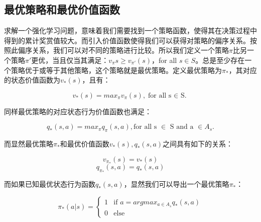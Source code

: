 \documentclass{standalone}
\begin{document}
\subsection{最优策略和最优价值函数}
求解一个强化学习问题，意味着我们需要找到一个策略函数，使得其在决策过程中得到的累计奖赏值较大。而引入价值函数使得我们可以获得对策略的偏序关系。按照此偏序关系，我们可以对不同的策略进行比较。所以我们定义一个策略$\pi$比另一个策略$\pi'$更优，当且仅当其满足：$v_{\pi}{}s \geq v_{\pi'}(s)$，for all $s \in S$。总是至少存在一个策略优于或等于其他策略，这个策略就是最优策略。定义最优策略为$\pi_{*}$，其对应的状态价值函数为$v_{*}(s)$，且有：
\begin{center}
    \begin{equation}
        v_{*}(s) = max_{\pi}v_{\pi}(s),
        \mbox{for all s $\in$ S.}
    \end{equation}
\end{center}
同样最优策略的对应状态行为价值函数也满足：
\begin{center}
    \begin{equation}
        q_{*}(s, a) = max_{\pi}q_{\pi}(s, a),
        \mbox{for all s $\in$ S and a $\in A_s$.}
    \end{equation}
\end{center}
而显然最优策略$\pi_{*}$和最优价值函数$v_{*}(s), q_{*}(s, a)$之间具有如下的关系：
\begin{center}
    \begin{equation}
        v_{\pi_*}(s) = v_{*}(s)
    \end{equation}
    \begin{equation}
        q_{\pi_*}(s, a) = q_{*}(s, a)
    \end{equation}
\end{center}
而如果已知最优状态行为函数$q_{*}(s, a)$，显然我们可以导出一个最优策略$\pi_{*}$：
\begin{center}
    \begin{equation}
    \pi_{*}(a|s) = \begin{cases}
    1 &\mbox{if $a = argmax_{a \in A_s}q_{*}(s, a)$}\\
    0 &\mbox{else}
    \end{cases}
    \label{eq4optimalpolicy}
    \end{equation}
    
\end{center}
\end{document}
